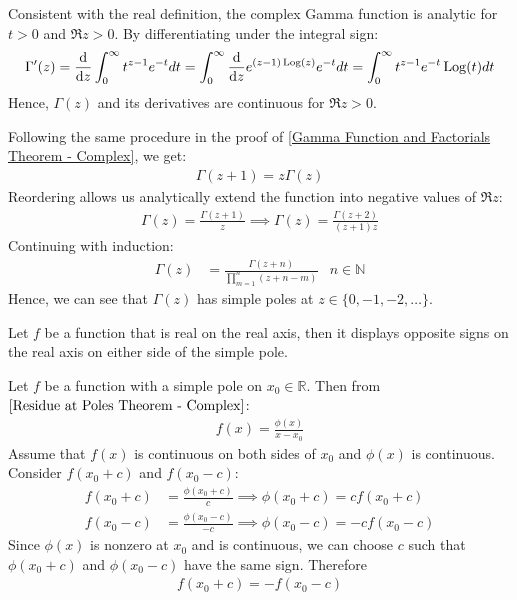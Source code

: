 \documentclass[12pt, english]{book}
\makeatletter
\renewenvironment{proof}[1][\proofname]{\par
	\pushQED{\qed}%
	\normalfont \topsep6\p@\@plus6\p@\relax
	\list{}{%
		\settowidth{\leftmargin}{\itshape\proofname:\hskip\labelsep}%
		\setlength{\labelwidth}{0pt}%
		\setlength{\itemindent}{-\leftmargin}%
		}%
	\item[\hskip\labelsep\itshape#1\@addpunct{:}]\ignorespaces
	}{\popQED\endlist\@endpefalse}
\makeatother
\begin{document}
	Consistent with the real definition, the complex Gamma function is analytic for \(t>0\) and \(\Re{z}>0\). By differentiating under the integral sign:
	\begin{align*}
		\Gamma '(z) = \dv{z} \int_{0}^{\infty} t^{z-1} e^{-t} dt  
			= \int_{0}^{\infty} \dv{z} e^{(z-1) \operatorname{Log}(z)} e^{-t} dt
			= \int_{0}^{\infty} t^{z-1} e^{-t} \operatorname{Log}(t) dt
	\end{align*}
	Hence, \(\Gamma(z)\) and its derivatives are continuous for \(\Re{z}>0\).
	
	Following the same procedure in the proof of \cref{Gamma Function and Factorials Theorem - Complex}, we get:
	\begin{align*}
		\Gamma(z+1) = z \Gamma(z)
	\end{align*}
	Reordering allows us analytically extend the function into negative values of \(\Re{z}\):
	\begin{align*}
		\Gamma(z) = \frac{\Gamma(z+1)}{z} \implies \Gamma(z) = \frac{\Gamma(z+2)}{(z+1)z}
	\end{align*}
	Continuing with induction:
	\begin{align*}
		\Gamma(z) &= \frac{\Gamma(z+n)}{\prod_{m=1}^{n} (z + n - m)}
			& n \in \mathbb{N}
	\end{align*}
	Hence, we can see that \(\Gamma(z)\) has simple poles at \(z \in \{0, -1, -2, \ldots\}\).
	
	\begin{theorem}
		\label{Function real on real axis implies alternating sign across simple pole on real axis theorem - Complex}
		Let \(f\) be a function that is real on the real axis, then it displays opposite signs on the real axis on either side of the simple pole.
	\end{theorem}
	\begin{proof}
		{\color{Grey}
		Let \(f\) be a function with a simple pole on \(x_0 \in \mathbb{R}\). Then from \(\cref{Residue at Poles Theorem - Complex}\):
		\begin{align*}
			f(x) = \frac{\phi(x)}{x-x_0}
		\end{align*}
		Assume that \(f(x)\) is continuous on both sides of \(x_0\) and \(\phi(x)\) is continuous. Consider \(f(x_0 + c)\) and \(f(x_0 - c)\):
		\begin{align*}
			f(x_0 + c) &= \frac{\phi(x_0 + c)}{c} \implies \phi(x_0 + c) = c f(x_0 + c)\\
			f(x_0 - c) &= \frac{\phi(x_0 - c)}{-c} \implies \phi(x_0 - c) = -c f(x_0 - c)
		\end{align*}
		Since \(\phi(x)\) is nonzero at \(x_0\) and is continuous, we can choose \(c\) such that \(\phi(x_0 + c)\) and \(\phi(x_0 - c)\) have the same sign. Therefore
		\begin{align*}
			f(x_0 + c) = - f(x_0 - c)
		\end{align*}
		}
	\end{proof}
	
\end{document}
